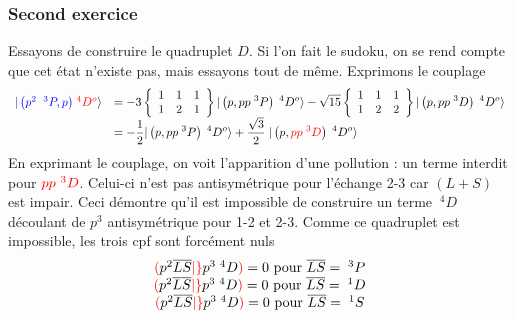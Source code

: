 \subsubsection{Second exercice}
Essayons de construire le quadruplet $D$. Si l'on fait le sudoku, on se rend compte que cet état
n'existe pas, mais essayons tout de même. Exprimons le couplage
\begin{equation}
\begin{array}{ll}
 {\color{blue}
\vert \left( p^{2} \; \; ^3P, p \right)  }\;  {\color{red}^4 D^o}
 \rangle 
&\displaystyle= 
 - 3 
\left\{ 
\begin{array}{ccc}
1 & 1 & 1 \\
1 & 2 & 1
\end{array}
\right\}
\vert \left( p, pp  \; ^3P \right) \; ^4D^o \rangle 
- \sqrt{15}
\left\{ 
\begin{array}{ccc}
1 & 1 & 1 \\
1 & 2 & 2
\end{array}
\right\}
\vert \left( p, pp  \; ^3D \right) \; ^4D^o \rangle\\
&\displaystyle=
- \frac{1}{2}  
\vert \left( p, pp  \; ^3P \right) \; ^4D^o \rangle 
+ \frac{\sqrt{3}}{2} \; 
\vert \left( p, {\color{red} pp  \; ^3D} \right) \; ^4D^o \rangle
\end{array}
\end{equation}
En exprimant le couplage, on voit l'apparition d'une pollution : un terme interdit pour 
${\color{red}pp\ ^3D}$. Celui-ci n'est pas antisymétrique pour l'échange 2-3 car $(L+S)$ est impair. Ceci
démontre qu'il est impossible de construire un terme $\ ^4D$ découlant de $p^3$ antisymétrique
pour 1-2 et 2-3. Comme ce quadruplet est impossible, les trois cpf sont forcément nuls
\begin{equation}
\begin{array}{c}
  {\color{red}( } p^{2}  \overline{L} \overline{S} 
{\color{red} \vert \} }
 p^3 \; ^4D {\color{red} )} = 0 ~\mbox{pour}~
\overline{L} \overline{S}  = \; ^3P\\
  {\color{red}( } p^{2}  \overline{L} \overline{S} 
{\color{red} \vert \} }
 p^3 \; ^4D {\color{red} )} = 0 ~\mbox{pour}~
\overline{L} \overline{S}  = \; ^1D\\
  {\color{red}( } p^{2}  \overline{L} \overline{S} 
{\color{red} \vert \} }
 p^3 \; ^4D {\color{red} )} = 0 ~\mbox{pour}~
\overline{L} \overline{S}  = \; ^1S
\end{array}
\end{equation}

